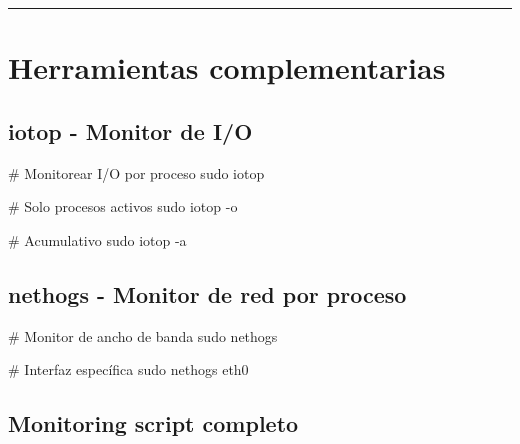 \documentclass[
  11pt,
  letterpaper,
  oneside,
  openany]{scrbook}
\newenvironment{Shaded}{}{}
\newcommand{\AttributeTok}[1]{\textcolor[rgb]{0.84,0.23,0.29}{#1}}
\newcommand{\CommentTok}[1]{\textcolor[rgb]{0.42,0.45,0.49}{#1}}
\newcommand{\FunctionTok}[1]{\textcolor[rgb]{0.44,0.26,0.76}{#1}}
\newcommand{\NormalTok}[1]{\textcolor[rgb]{0.14,0.16,0.18}{#1}}
\begin{document}
\begin{center}\rule{0.5\linewidth}{0.5pt}\end{center}

\section{Herramientas
complementarias}\label{herramientas-complementarias-1}

\subsection{iotop - Monitor de I/O}\label{iotop---monitor-de-io}

\begin{Shaded}
\begin{Highlighting}[]
\CommentTok{\# Monitorear I/O por proceso}
\FunctionTok{sudo}\NormalTok{ iotop}

\CommentTok{\# Solo procesos activos}
\FunctionTok{sudo}\NormalTok{ iotop }\AttributeTok{{-}o}

\CommentTok{\# Acumulativo}
\FunctionTok{sudo}\NormalTok{ iotop }\AttributeTok{{-}a}
\end{Highlighting}
\end{Shaded}

\subsection{nethogs - Monitor de red por
proceso}\label{nethogs---monitor-de-red-por-proceso}

\begin{Shaded}
\begin{Highlighting}[]
\CommentTok{\# Monitor de ancho de banda}
\FunctionTok{sudo}\NormalTok{ nethogs}

\CommentTok{\# Interfaz específica}
\FunctionTok{sudo}\NormalTok{ nethogs eth0}
\end{Highlighting}
\end{Shaded}

\subsection{Monitoring script
completo}\label{monitoring-script-completo}
\end{document}
